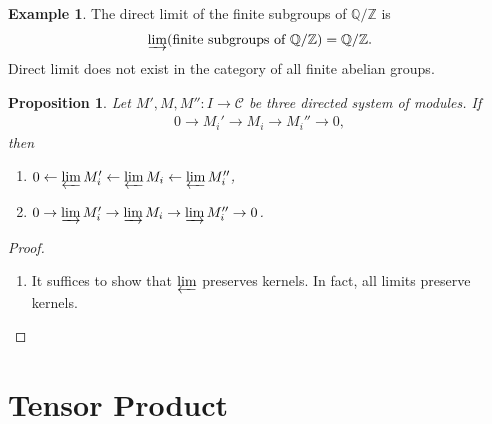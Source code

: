 \documentclass[12pt]{report}
\theoremstyle{plain}
\newtheorem{proposition}[theorem]{Proposition}
\theoremstyle{remark}
\theoremstyle{definition}
\newtheorem{example}[theorem]{Example}
\newcommand{\Z}{\mathbb{Z}}
\newcommand{\Q}{\mathbb{Q}}
\begin{document}
\begin{example}
    The direct limit of the finite subgroups of $\Q/\Z$ is
    \begin{align*}
        \varinjlim(\text{finite subgroups of }\Q/\Z)=\Q/\Z.
    \end{align*}
    Direct limit does not exist in the category of all finite abelian groups.
\end{example}

\begin{proposition}
    Let $M',M,M'':I\to\mathcal{C}$ be three directed system of modules. If
    \begin{align*}
        0\to M_i'\to M_i\to M_i''\to 0,
    \end{align*}
    then
    \begin{enumerate}
        \item $0\leftarrow \varprojlim M_i' \leftarrow \varprojlim M_i \leftarrow \varprojlim M_i''$,
        \item $0\to \varinjlim M_i' \to \varinjlim M_i \to \varinjlim M_i'' \to 0$.
    \end{enumerate}
\end{proposition}
\begin{proof}
    \begin{enumerate}
        \item It suffices to show that $\varprojlim$ preserves kernels. In fact, all limits preserve kernels.
    \end{enumerate}
\end{proof}










\chapter{Tensor Product}
\end{document}
